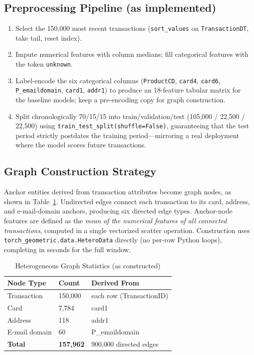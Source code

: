 \documentclass[conference]{IEEEtran}
\begin{document}
\subsection{Preprocessing Pipeline (as implemented)}
\begin{enumerate}
  \item Select the 150{,}000 most recent transactions
        (\texttt{sort\_values} on \texttt{TransactionDT}, take tail,
        reset index).
  \item Impute numerical features with column medians; fill categorical
        features with the token \texttt{unknown}.
  \item Label-encode the six categorical columns
        (\texttt{ProductCD}, \texttt{card4}, \texttt{card6},
        \texttt{P\_emaildomain}, \texttt{card1}, \texttt{addr1}) to
        produce an 18-feature tabular matrix for the baseline models;
        keep a pre-encoding copy for graph construction.
  \item Split chronologically 70/15/15 into train/validation/test
        (105{,}000 / 22{,}500 / 22{,}500) using
        \texttt{train\_test\_split(shuffle=False)}, guaranteeing that the
        test period strictly postdates the training period---mirroring a
        real deployment where the model scores future transactions.
\end{enumerate}

\subsection{Graph Construction Strategy}
Anchor entities derived from transaction attributes become graph nodes, as
shown in Table~\ref{tab:graphnodes}. Undirected edges connect each
transaction to its card, address, and e-mail-domain anchors, producing
six directed edge types. Anchor-node features are defined as the
\emph{mean of the numerical features of all connected transactions},
computed in a single vectorized scatter operation. Construction uses
\texttt{torch\_geometric.data.HeteroData} directly (no per-row Python
loops), completing in seconds for the full window.

\begin{table}[htbp]
\caption{Heterogeneous Graph Statistics (as constructed)}
\label{tab:graphnodes}
\centering
\footnotesize
\begin{tabular}{p{2.6cm}p{1.4cm}p{2.6cm}}
\hline
\textbf{Node Type} & \textbf{Count} & \textbf{Derived From} \\
\hline
Transaction & 150{,}000 & each row (TransactionID) \\
Card & 7{,}784 & card1 \\
Address & 118 & addr1 \\
E-mail domain & 60 & P\_emaildomain \\
\hline
\textbf{Total} & \textbf{157{,}962} & 900{,}000 directed edges \\
\hline
\end{tabular}
\end{table}
\end{document}
